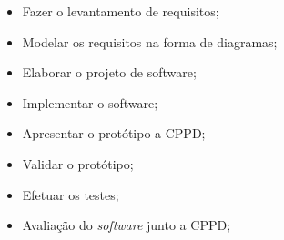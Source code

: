    
\begin{itemize}
    \item {Fazer o levantamento de requisitos;}
    \item {Modelar os requisitos na forma de diagramas;}
    \item {Elaborar o projeto de software;}
    \item {Implementar o software;}
    \item {Apresentar o protótipo a CPPD;}
    \item {Validar o protótipo;}
    \item {Efetuar os testes;}
    \item {Avaliação do \textit{software} junto a CPPD;}

\end{itemize}





